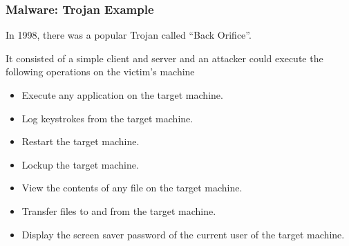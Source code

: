 \begin{frame}
\frametitle{Malware: Trojan Example}
\begin{changemargin}{1cm}
In 1998, there was a popular Trojan called ``Back Orifice''. 

It consisted of a simple client and server and an attacker could execute the following operations on the victim's machine

\begin{itemize}
\item Execute any application on the target machine.
\item Log keystrokes from the target machine.
\item Restart the target machine.
\item Lockup the target machine.
\item View the contents of any file on the target machine.
\item Transfer files to and from the target machine.
\item Display the screen saver password of the current user of the target machine. 
\end{itemize}


\end{changemargin}
\end{frame}


